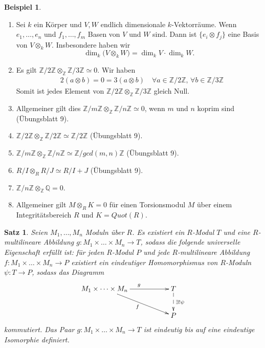 \documentclass[reqno,12pt]{article}
\numberwithin{equation}{section}
\newcommand{\bQ}{\mathbb{Q}}
\newcommand{\bZ}{\mathbb{Z}}
\newcommand{\iso}{\simeq}
\theoremstyle{plain}
\newtheorem{proposition}[thm]{Satz}
\theoremstyle{definition}
\newtheorem{example}[thm]{Beispiel}
\begin{document}
\begin{example}
\
\begin{enumerate}
\item Sei $k$ ein Körper und $V, W$ endlich dimensionale $k$-Vektorräume. Wenn $e_1, \dots , e_n$ und $f_1, \dots, f_m$ Basen von $V$ und $W$ sind. Dann ist $\{e_i \otimes f_j\}$ eine Basis von $V \otimes_k W$. Insbesondere haben wir
$$
\dim_k \big( V \otimes_k W \big) = \dim_k V \cdot \dim_k W.
$$

\item Es gilt $\bZ / 2 \bZ \otimes_{\bZ} \bZ / 3 \bZ \iso 0 $. Wir haben
\begin{align*}
&2 ( a \otimes b ) = 0 = 3( a \otimes b ) \quad \forall a \in \bZ / 2\bZ  , \,  \forall b \in \bZ / 3 \bZ
\end{align*}
Somit ist jedes Element von $\bZ / 2 \bZ \otimes_{\bZ} \bZ / 3 \bZ$ gleich Null.

\item Allgemeiner gilt dies $\bZ / m \bZ \otimes_{\bZ} \bZ / n \bZ \iso 0$, wenn $m$ und $n$ koprim sind (Übungsblatt 9).

\item $\bZ / 2 \bZ \otimes_{\bZ} \bZ / 2 \bZ \iso \bZ / 2 \bZ $ (Übungsblatt 9).

\item $\bZ / m \bZ \otimes_{\bZ} \bZ / n \bZ \iso \bZ / gcd(m,n) \bZ $ (Übungsblatt 9).

\item $R / I \otimes_{R} R / J \iso R / I + J$ (Übungsblatt 9).

\item $\bZ / n \bZ  \otimes_{\bZ} \bQ = 0$.

\item Allgemeiner gilt $M \otimes_{R} K = 0$ für einen Torsionsmodul $M$ über einem Integritätsbereich $R$ und $K=Quot(R)$.
\end{enumerate}
\end{example}


\begin{proposition}
Seien $M_1, \dots , M_n$ Moduln über $R$. Es existiert ein $R$-Modul $T$ und eine $R$-multilineare Abbildung $g \colon M_1  \times \dots \times M_n \to T$, sodass die folgende universelle Eigenschaft erfüllt ist: für jeden $R$-Modul $P$ und jede $R$-multilineare Abbildung $f \colon M_1 \times  \dots \times M_n \to P$ existiert ein eindeutiger Homomorphismus von $R$-Moduln $\psi \colon T \to P$, sodass das Diagramm
\begin{align*}
\xymatrix{
M_1 \times \dots \times M_n \ar[rr]^g \ar[rrd]_f & & T  \ar@{-->}[d]^{\exists ! \psi} \\
           & & P
}
\end{align*}
kommutiert. Das Paar $g \colon M_1 \times \dots \times M_n \to T$ ist eindeutig bis auf eine eindeutige Isomorphie definiert.
\end{proposition}
\end{document}
